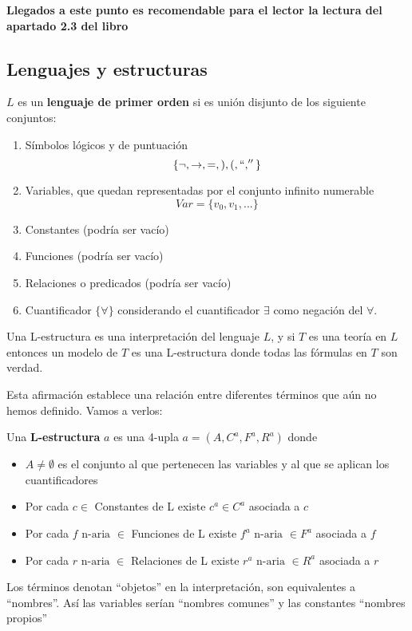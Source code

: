 \textbf{Llegados a este punto es recomendable para el lector la lectura del apartado 2.3 del libro}

\subsection{Lenguajes y estructuras}

\begin{defn}
$L$ es un \textbf{lenguaje de primer orden} si es unión disjunto de los siguiente conjuntos:
\begin{enumerate}
\item Símbolos lógicos y de puntuación
\[\{\neg, \to , = , ), (, ``,''\}\]
\item Variables, que quedan representadas por el conjunto infinito numerable
\[Var = \{v_0,v_1,...\}\]
\item Constantes (podría ser vacío)
\item Funciones (podría ser vacío)
\item Relaciones o predicados (podría ser vacío)
\item Cuantificador $\{\forall \}$ considerando el cuantificador $\exists$ como negación del $\forall$.
\end{enumerate}
\end{defn}

Una L-estructura es una interpretación del lenguaje $L$, y si $T$ es una teoría en $L$ entonces un modelo de $T$ es una L-estructura donde todas las fórmulas en $T$ son verdad.

Esta afirmación establece una relación entre diferentes términos que aún no hemos definido. Vamos a verlos:

\begin{defn}[L-estructura]
Una \textbf{L-estructura} $a$ es una 4-upla $a=(A,C^a,F^a,R^a)$ donde
\begin{itemize}
\item $A\neq \emptyset$ es el conjunto al que pertenecen las variables y al que se aplican los cuantificadores
\item Por cada $c \in $ Constantes de L existe $c^a\in C^a$ asociada a $c$
\item Por cada $f \text{ n-aria } \in $ Funciones de L existe $f^a\text{ n-aria }\in F^a$ asociada a $f$
\item Por cada $r \text{ n-aria }\in $ Relaciones de L existe $r^a \text{ n-aria }\in R^a$ asociada a $r$
\end{itemize}
Los términos denotan ``objetos'' en la interpretación, son equivalentes a ``nombres''. Así las variables serían ``nombres comunes'' y las constantes ``nombres propios''
\end{defn}

